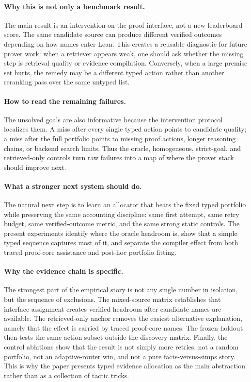 \documentclass{article}
\begin{document}
\paragraph{Why this is not only a benchmark result.}
The main result is an intervention on the proof interface, not a new leaderboard score. The same candidate source can produce different verified outcomes depending on how names enter Lean. This creates a reusable diagnostic for future prover work: when a retriever appears weak, one should ask whether the missing step is retrieval quality or evidence compilation. Conversely, when a large premise set hurts, the remedy may be a different typed action rather than another reranking pass over the same untyped list.

\paragraph{How to read the remaining failures.}
The unsolved goals are also informative because the intervention protocol localizes them. A miss after every single typed action points to candidate quality; a miss after the full portfolio points to missing proof actions, longer reasoning chains, or backend search limits. Thus the oracle, homogeneous, strict-goal, and retrieved-only controls turn raw failures into a map of where the prover stack should improve next.

\paragraph{What a stronger next system should do.}
The natural next step is to learn an allocator that beats the fixed typed portfolio while preserving the same accounting discipline: same first attempt, same retry budget, same verified-outcome metric, and the same strong static controls. The present experiments identify where the oracle headroom is, show that a simple typed sequence captures most of it, and separate the compiler effect from both traced proof-core assistance and post-hoc portfolio fitting.

\paragraph{Why the evidence chain is specific.}
The strongest part of the empirical story is not any single number in isolation, but the sequence of exclusions. The mixed-source matrix establishes that interface assignment creates verified headroom after candidate names are available. The retrieved-only anchor removes the easiest alternative explanation, namely that the effect is carried by traced proof-core names. The frozen holdout then tests the same action subset outside the discovery matrix. Finally, the control ablations show that the result is not simply more retries, not a random portfolio, not an adaptive-router win, and not a pure facts-versus-simps story. This is why the paper presents typed evidence allocation as the main abstraction rather than as a collection of tactic tricks.
\end{document}

